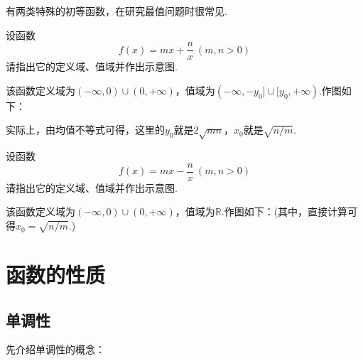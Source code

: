 \documentclass[lang=cn, zihao=5]{elegantbook}
\newcommand{\R}{\mathbb{R}}
\begin{document}
\newpage
有两类特殊的初等函数，在研究最值问题时很常见.

\begin{example}
    设函数$$f(x)=mx+\frac{n}{x}~(m,n>0)$$
    请指出它的定义域、值域并作出示意图.
\end{example}
\begin{solution}
	该函数定义域为$(-\infty ,0) \cup (0,+\infty)$，值域为$(-\infty ,-y_0] \cup [y_0 ,+\infty )$.作图如下：
    \begin{figure}[h!]
		\centering
		
	\end{figure}
	
	\noindent
	实际上，由均值不等式可得，这里的$y_0$就是$2\sqrt{mn}$，$x_0$就是$\sqrt{n/m}$.
\end{solution}

\begin{example}
    设函数$$f(x)=mx-\frac{n}{x}~(m,n>0)$$
    请指出它的定义域、值域并作出示意图.
\end{example}
\begin{solution}
	该函数定义域为$(-\infty ,0) \cup (0,+\infty)$，值域为$\R$.作图如下：(其中，直接计算可得$x_0=\sqrt{n/m}$.)
    \begin{figure}[h!]
		\centering
		
	\end{figure}
\end{solution}

\newpage
\section{函数的性质}

\subsection{单调性}

先介绍单调性的概念：
\end{document}
